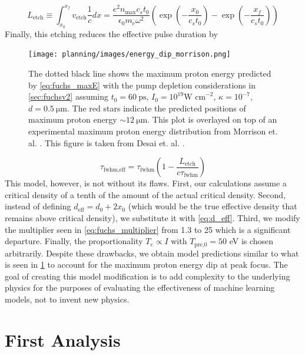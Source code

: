 \begin{equation}
	L_\text{etch} \equiv \int_{x_0}^{x_f} v_\text{etch} \frac{1}{c} dx = \frac{e^2 n_\text{max} c_s t_0}{\epsilon_0 m_e \omega^2} \left( \exp{\left(-\frac{x_0}{c_s t_0}\right)} - \exp{\left(-\frac{x_f}{c_s t_0}\right)} \right)
\end{equation}
Finally, this etching reduces the effective pulse duration by 

\begin{figure}
	\centering 
	\texttt{[image: planning/images/energy\_dip\_morrison.png]}
	\caption{The dotted black line shows the maximum proton energy predicted by \cref{eq:fuchs_maxE} with the pump depletion considerations in \cref{sec:fuchsv2} assuming $t_0 = \SI{60}{\pico \second}$, $I_0 = 10^{19} \text{W cm}^{-2}$, $\kappa=10^{-7}$, $d=\SI{0.5}{\micro \meter}$. The red stars indicate the predicted positions of maximum proton energy $\sim \SI{12}{\micro \meter}$. This plot is overlayed on top of an experimental maximum proton energy distribution from Morrison et. al. \cite{Morrison_2018_NJoP}. This figure is taken from Desai et. al. \cite{Desai_2025_APL}.}
	\label{fig:energy_dip_morrison}
\end{figure}
\begin{equation}
	\tau_\text{fwhm,eff} = \tau_\text{fwhm} (1 - \frac{L_\text{etch}}{c \tau_\text{fwhm}}) \label{eq:tau_etch}
\end{equation}
This model, however, is not without its flaws. First, our calculations assume a critical density of a tenth of the amount of the actual critical density. Second, instead of defining $d_\text{eff} = d_0 + 2 x_0$ (which would be the true effective density that remains above critical density), we substitute it with \cref{eq:d_eff}. Third, we modify the multiplier seen in \cref{eq:fuchs_multiplier} from 1.3 to 25 which is a significant departure. Finally, the proportionality $T_e \propto I$ with $T_\text{pre,0} = 50$ eV is chosen arbitrarily. Despite these drawbacks, we obtain model predictions similar to what is seen in \cref{fig:energy_dip_morrison} to account for the maximum proton energy dip at peak focus. The goal of creating this model modification is to add complexity to the underlying physics for the purposes of evaluating the effectiveness of machine learning models, not to invent new physics. 

\section{First Analysis} \label{sec:first_analysis}

